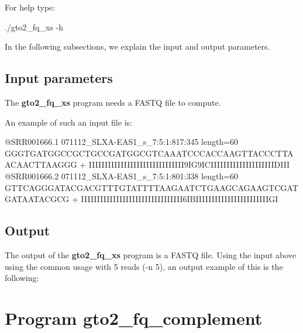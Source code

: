\documentclass[11pt,]{krantz}
\newenvironment{Shaded}{\begin{snugshade}}{\end{snugshade}}
\newcommand{\ExtensionTok}[1]{#1}
\newcommand{\NormalTok}[1]{#1}
\begin{document}
For help type:

\begin{Shaded}
\begin{Highlighting}[]
\ExtensionTok{./gto2_fq_xs}\NormalTok{ -h}
\end{Highlighting}
\end{Shaded}

In the following subsections, we explain the input and output
parameters.

\subsection*{Input parameters}\label{input-parameters-20}


The \textbf{gto2\_fq\_xs} program needs a FASTQ file to compute.

An example of such an input file is:

\begin{Shaded}
\begin{Highlighting}[]
\ExtensionTok{@SRR001666.1}\NormalTok{ 071112_SLXA-EAS1_s_7:5:1:817:345 length=60}
\ExtensionTok{GGGTGATGGCCGCTGCCGATGGCGTCAAATCCCACCAAGTTACCCTTAACAACTTAAGGG}
\ExtensionTok{+}
\ExtensionTok{IIIIIIIIIIIIIIIIIIIIIIIIIIIIII9IG9ICIIIIIIIIIIIIIIIIIIIIDIII}
\ExtensionTok{@SRR001666.2}\NormalTok{ 071112_SLXA-EAS1_s_7:5:1:801:338 length=60}
\ExtensionTok{GTTCAGGGATACGACGTTTGTATTTTAAGAATCTGAAGCAGAAGTCGATGATAATACGCG}
\ExtensionTok{+}
\ExtensionTok{IIIIIIIIIIIIIIIIIIIIIIIIIIIIIIII6IBIIIIIIIIIIIIIIIIIIIIIIIGI}
\end{Highlighting}
\end{Shaded}

\subsection*{Output}\label{output-20}


The output of the \textbf{gto2\_fq\_xs} program is a FASTQ file. Using
the input above using the common usage with 5 reads (-n 5), an output
example of this is the following:

\begin{Shaded}
\begin{Highlighting}[]

\end{Highlighting}
\end{Shaded}

\section{Program gto2\_fq\_complement}\label{program-gto2_fq_complement}
\end{document}

